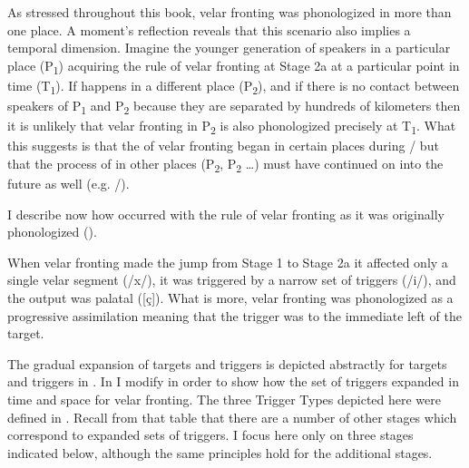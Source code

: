 As stressed throughout this book, velar fronting was phonologized in more than one place. A moment’s reflection reveals that this scenario also implies a temporal dimension. Imagine the younger generation of speakers in a particular place (P\textsubscript{1}) acquiring the rule of velar fronting at Stage 2a at a particular point in time (T\textsubscript{1}). If  happens in a different place (P\textsubscript{2}), and if there is no contact between speakers of P\textsubscript{1} and P\textsubscript{2} because they are separated by hundreds of kilometers then it is unlikely that velar fronting in P\textsubscript{2} is also phonologized precisely at T\textsubscript{1}. What this suggests is that the  of velar fronting began in certain places during / but that the process of  in other places (P\textsubscript{2}, P\textsubscript{2} …) must have continued on into the future as well (e.g. /).

I describe now how  occurred with the rule of velar fronting as it was originally phonologized ().

When velar fronting made the jump from Stage 1 to Stage 2a it affected only a single velar segment (/x/), it was triggered by a narrow set of triggers (/i/), and the output was palatal ([ç]). What is more, velar fronting was phonologized as a progressive assimilation meaning that the trigger was to the immediate left of the target.

The gradual expansion of targets and triggers is depicted abstractly for targets and triggers in . In  I modify  in order to show how the set of triggers expanded in time and space for velar fronting. The three Trigger Types depicted here were defined in . Recall from that table that there are a number of other stages which correspond to expanded sets of triggers. I focus here only on three stages indicated below, although the same principles hold for the additional stages.

